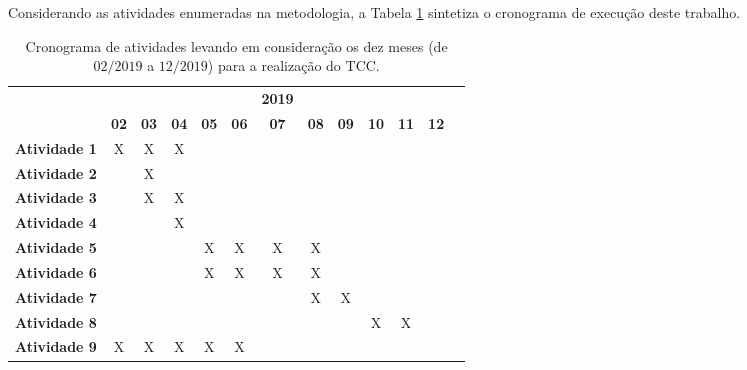 Considerando as atividades enumeradas na metodologia, a Tabela \ref{tab:cronograma} sintetiza o cronograma de execução deste trabalho.

\begin{table}[h!]
\caption{Cronograma de atividades levando em consideração os dez meses (de $02/2019$ a $12/2019$) para a realização do TCC.}
\label{tab:cronograma}

\begin{center}
\begin{small}
\begin{tabular}{p{5cm}cccccccccccc}
  \toprule
  & &  &  & &  & \textbf{2019}  & &  &  &  &  & \\
                                        & \textbf{02} & \textbf{03} & \textbf{04} & \textbf{05} & \textbf{06} & \textbf{07} & \textbf{08} & \textbf{09} & \textbf{10} & \textbf{11} & \textbf{12} \\
  \midrule

  \textbf{Atividade 1}                     &      X      &      X      &      X      &           &             &             &             &             &             &             &             \\
  \textbf{Atividade 2} &             &      X      &            &             &             &             &             &             &             &             &             \\
  \textbf{Atividade 3}         &             &     X        &    X         &            &            &            &            &            &             &             &             \\
  \textbf{Atividade 4}         &             &             &    X         &            &            &            &            &            &             &             &             \\
  \textbf{Atividade 5}         &             &             &             &      X      &       X     &   X         &     X       &            &             &             &             \\
  \textbf{Atividade 6}         &             &             &             &      X      &     X       &     X       &    X        &            &             &             &             \\
  \textbf{Atividade 7}         &             &             &             &            &            &            &      X      &      X      &             &             &             \\
  \textbf{Atividade 8}         &             &             &             &            &            &            &           &            &   X          &      X       &             \\
  \textbf{Atividade 9}          &      X      &      X      &      X      &      X      &      X      &             &             &             &             &             &             \\


\end{tabular}
\end{small}
\end{center}
\end{table}
